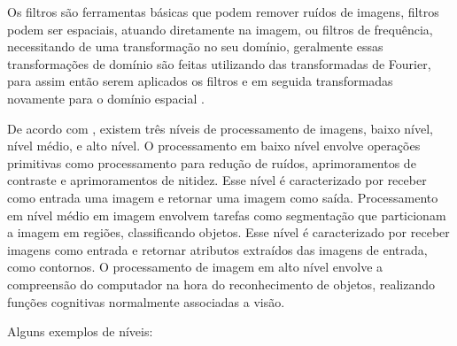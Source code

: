 Os filtros são ferramentas básicas que podem remover ruídos de imagens, filtros podem ser espaciais, atuando diretamente na imagem, ou filtros de frequência, necessitando de uma transformação no seu domínio, geralmente essas transformações de domínio são feitas utilizando das transformadas de Fourier, para assim então serem aplicados os filtros e em seguida transformadas novamente para o domínio espacial \cite{marengoni:2009}.


De acordo com , existem três níveis de processamento de imagens, baixo nível, nível médio, e alto nível. O processamento em baixo nível envolve operações primitivas como processamento para redução de ruídos, aprimoramentos de contraste e aprimoramentos de nitidez. Esse nível é caracterizado por receber como entrada uma imagem e retornar uma imagem como saída. Processamento em nível médio em imagem envolvem tarefas como segmentação que particionam a imagem em regiões, classificando objetos. Esse nível é caracterizado por receber imagens como entrada e retornar atributos extraídos das imagens de entrada, como contornos. O processamento de imagem em alto nível envolve a compreensão do computador na hora do reconhecimento de objetos, realizando funções cognitivas normalmente associadas a visão.

Alguns exemplos de níveis:

